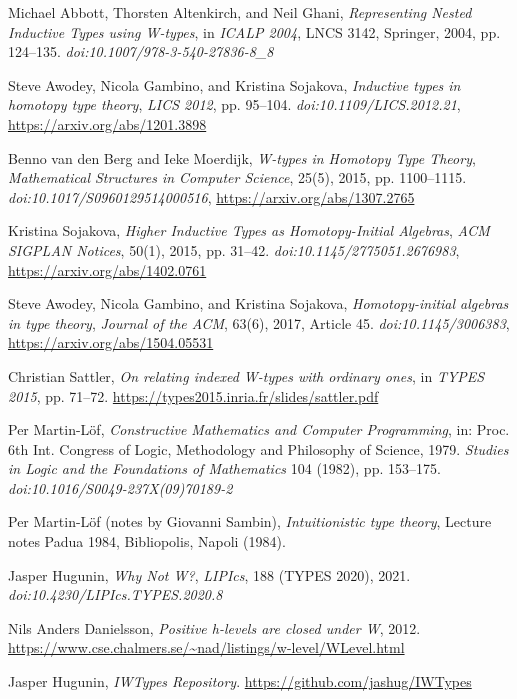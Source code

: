 \documentclass{article}
\begin{document}
\begin{thebibliography}{99}
Michael Abbott, Thorsten Altenkirch, and Neil Ghani,
\textit{Representing Nested Inductive Types using W-types},
in \textit{ICALP 2004}, LNCS 3142, Springer, 2004, pp. 124–135.
\textit{doi:10.1007/978-3-540-27836-8\_8}

Steve Awodey, Nicola Gambino, and Kristina Sojakova,
\textit{Inductive types in homotopy type theory},
\textit{LICS 2012}, pp. 95–104.
\textit{doi:10.1109/LICS.2012.21},
\url{https://arxiv.org/abs/1201.3898}

Benno van den Berg and Ieke Moerdijk,
\textit{W-types in Homotopy Type Theory},
\textit{Mathematical Structures in Computer Science}, 25(5), 2015, pp. 1100–1115.
\textit{doi:10.1017/S0960129514000516},
\url{https://arxiv.org/abs/1307.2765}

Kristina Sojakova,
\textit{Higher Inductive Types as Homotopy-Initial Algebras},
\textit{ACM SIGPLAN Notices}, 50(1), 2015, pp. 31–42.
\textit{doi:10.1145/2775051.2676983},
\url{https://arxiv.org/abs/1402.0761}

Steve Awodey, Nicola Gambino, and Kristina Sojakova,
\textit{Homotopy-initial algebras in type theory},
\textit{Journal of the ACM}, 63(6), 2017, Article 45.
\textit{doi:10.1145/3006383},
\url{https://arxiv.org/abs/1504.05531}

Christian Sattler,
\textit{On relating indexed W-types with ordinary ones},
in \textit{TYPES 2015}, pp. 71–72.
\url{https://types2015.inria.fr/slides/sattler.pdf}

Per Martin-Löf,
\textit{Constructive Mathematics and Computer Programming},
in: Proc. 6th Int. Congress of Logic, Methodology and Philosophy of Science, 1979. \textit{Studies in Logic and the Foundations of Mathematics} 104 (1982), pp. 153–175.
\textit{doi:10.1016/S0049-237X(09)70189-2}

Per Martin-Löf (notes by Giovanni Sambin),
\textit{Intuitionistic type theory}, Lecture notes Padua 1984, Bibliopolis, Napoli (1984).

Jasper Hugunin,
\textit{Why Not W?},
\textit{LIPIcs}, 188 (TYPES 2020), 2021.
\textit{doi:10.4230/LIPIcs.TYPES.2020.8}

Nils Anders Danielsson,
\textit{Positive h-levels are closed under W},
2012.
\url{https://www.cse.chalmers.se/~nad/listings/w-level/WLevel.html}

Jasper Hugunin,
\textit{IWTypes Repository}.
\url{https://github.com/jashug/IWTypes}

\end{thebibliography}
\end{document}
